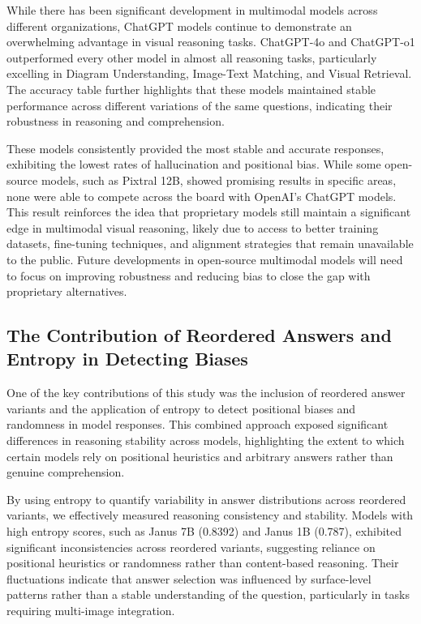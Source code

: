 While there has been significant development in multimodal models across different organizations, ChatGPT models continue to demonstrate an overwhelming advantage in visual reasoning tasks. ChatGPT-4o and ChatGPT-o1 outperformed every other model in almost all reasoning tasks, particularly excelling in Diagram Understanding, Image-Text Matching, and Visual Retrieval. The accuracy table further highlights that these models maintained stable performance across different variations of the same questions, indicating their robustness in reasoning and comprehension.

These models consistently provided the most stable and accurate responses, exhibiting the lowest rates of hallucination and positional bias. While some open-source models, such as Pixtral 12B, showed promising results in specific areas, none were able to compete across the board with OpenAI’s ChatGPT models. This result reinforces the idea that proprietary models still maintain a significant edge in multimodal visual reasoning, likely due to access to better training datasets, fine-tuning techniques, and alignment strategies that remain unavailable to the public. Future developments in open-source multimodal models will need to focus on improving robustness and reducing bias to close the gap with proprietary alternatives.

\subsection{The Contribution of Reordered Answers and Entropy in Detecting Biases}

One of the key contributions of this study was the inclusion of reordered answer variants and the application of entropy to detect positional biases and randomness in model responses. This combined approach exposed significant differences in reasoning stability across models, highlighting the extent to which certain models rely on positional heuristics and arbitrary answers rather than genuine comprehension.

By using entropy to quantify variability in answer distributions across reordered variants, we effectively measured reasoning consistency and stability. Models with high entropy scores, such as Janus 7B (0.8392) and Janus 1B (0.787), exhibited significant inconsistencies across reordered variants, suggesting reliance on positional heuristics or randomness rather than content-based reasoning. Their fluctuations indicate that answer selection was influenced by surface-level patterns rather than a stable understanding of the question, particularly in tasks requiring multi-image integration.


